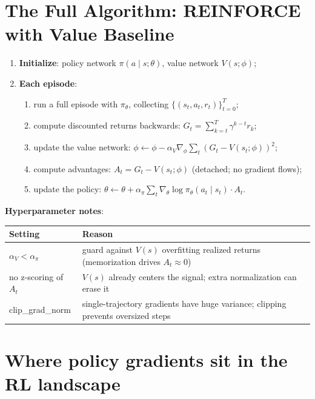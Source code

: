 \documentclass{article}
\begin{document}
\section*{The Full Algorithm: REINFORCE with Value Baseline}

\begin{enumerate}
  \item \textbf{Initialize}: policy network $\pi(a \mid s;\theta)$, value network $V(s;\phi)$;
  \item \textbf{Each episode}:
    \begin{enumerate}
      \item run a full episode with $\pi_\theta$, collecting $\{(s_t, a_t, r_t)\}_{t=0}^T$;
      \item compute discounted returns backwards: $G_t = \sum_{k=t}^T \gamma^{k-t} r_k$;
      \item update the value network: $\phi \leftarrow \phi - \alpha_V \nabla_\phi \sum_t (G_t - V(s_t;\phi))^2$;
      \item compute advantages: $A_t = G_t - V(s_t;\phi)$ (detached; no gradient flows);
      \item update the policy: $\theta \leftarrow \theta + \alpha_\pi \sum_t \nabla_\theta \log \pi_\theta(a_t \mid s_t) \cdot A_t$.
    \end{enumerate}
\end{enumerate}

\textbf{Hyperparameter notes}:

\begin{center}
\small
\begin{tabular}{l|l}
\textbf{Setting} & \textbf{Reason} \\
\hline
$\alpha_V < \alpha_\pi$ & guard against $V(s)$ overfitting realized returns (memorization drives $A_t \approx 0$) \\[4pt]
no z-scoring of $A_t$ & $V(s)$ already centers the signal; extra normalization can erase it \\[4pt]
clip\_grad\_norm & single-trajectory gradients have huge variance; clipping prevents oversized steps \\
\end{tabular}
\end{center}

\section*{Where policy gradients sit in the RL landscape}
\end{document}
